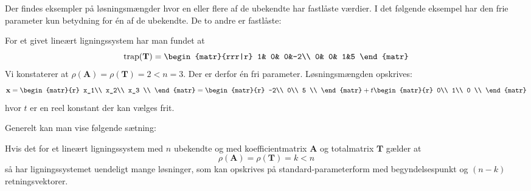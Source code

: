 Der findes eksempler på løsningsmængder hvor en eller flere af de ubekendte har fast\-lå\-ste værdier. I det følgende eksempel har den frie parameter kun betydning for én af de ubekendte. De to andre er fastlåste:

\begin{example}
For et givet lineært ligningssystem har man fundet at
\begin{equation}
\mathrm{trap}(\mathbf T)=
\begin{matr}{rrr|r}
 1& 0& 0&-2\\
 0& 0& 1&5
\end{matr}
\end{equation}
Vi konstaterer at $\rho(\mathbf A)= \rho(\mathbf T)=2<n=3$. Der er derfor én fri parameter. Løsningsmængden opskrives:
\begin{equation}
\mathbf x =
\begin{matr}{r}
 x_1\\
 x_2\\
 x_3 \\
\end{matr} 
=
\begin{matr}{r}
 -2\\
 0\\
 5 \\
\end{matr} 
+ t
\begin{matr}{r}
 0\\
 1\\
 0 \\
\end{matr}
\end{equation}
hvor $t$ er en reel konstant der kan vælges frit.
\end{example}

Generelt kan man vise følgende sætning:

\begin{theorem}[Når $\rho(\mathbf A)= \rho(\mathbf T) < $ antal ubekendte] \label{TN2.11c2}
Hvis det for et lineært ligningssystem med $n$ ubekendte og med koefficientmatrix $\mathbf A$ og totalmatrix $\mathbf T$ gælder at
\begin{equation}
\rho(\mathbf A)= \rho(\mathbf T)=k<n
\end{equation}
så har ligningssystemet uendeligt mange løsninger, som kan opskrives på standard-parameterform med begyndelsespunkt og $(n-k)$ retningsvektorer.
\end{theorem}


